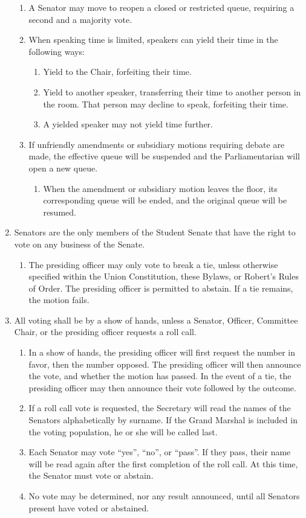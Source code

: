 \documentclass{bylaws}
\begin{document}
\begin{enumerate}
\begin{enumerate}
\item A Senator may move to reopen a closed or restricted queue, requiring a second and a majority vote.
\item When speaking time is limited, speakers can yield their time in the following ways:
\begin{enumerate}
\item Yield to the Chair, forfeiting their time.
\item Yield to another speaker, transferring their time to another person in the room. That person may decline to speak,
forfeiting their time.
\item A yielded speaker may not yield time further.
\end{enumerate}

\item If unfriendly amendments or subsidiary motions requiring debate are made, the effective queue will be suspended and the
Parliamentarian will open a new queue.
\begin{enumerate}
\item When the amendment or subsidiary motion leaves the floor, its corresponding queue will be ended, and the original
queue will be resumed.
\end{enumerate}
\end{enumerate}

\item Senators are the only members of the Student Senate that have the right to vote on any business of the Senate.
\begin{enumerate}
\item The presiding officer may only vote to break a tie, unless otherwise specified within the Union Constitution, these Bylaws,
or Robert’s Rules of Order. The presiding officer is permitted to abstain. If a tie remains, the motion fails.
\end{enumerate}

\item All voting shall be by a show of hands, unless a Senator, Officer, Committee Chair, or the presiding officer requests a roll call.
\begin{enumerate}
\item In a show of hands, the presiding officer will first request the number in favor, then the number opposed. The presiding
officer will then announce the vote, and whether the motion has passed. In the event of a tie, the presiding officer may then
announce their vote followed by the outcome.
\item If a roll call vote is requested, the Secretary will read the names of the Senators alphabetically by surname. If the Grand
Marshal is included in the voting population, he or she will be called last.
\item Each Senator may vote “yes”, “no”, or “pass”. If they pass, their name will be read again after the first completion of the
roll call. At this time, the Senator must vote or abstain.
\item No vote may be determined, nor any result announced, until all Senators present have voted or abstained.
\end{enumerate}


\end{enumerate}
\end{document}
